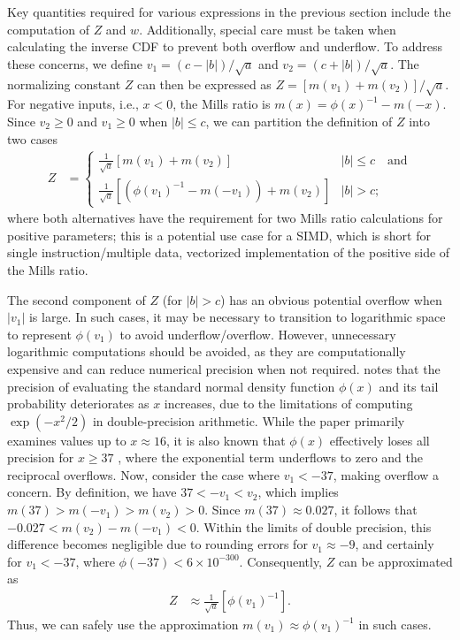 Key quantities required for various expressions in the previous section include the computation of $Z$ and $w$. Additionally, special care must be taken when calculating the inverse CDF to prevent both overflow and underflow. To address these concerns, we define $
v_{1}=\left(c-\left|b\right|\right)/\sqrt{a}$ and $ 
v_{2}=\left(c+\left|b\right|\right)/\sqrt{a}$. The normalizing constant 
$Z$ can then be expressed as
$Z = \left[m\left(v_{1}\right)+m\left(v_{2}\right)\right]/\sqrt{a}$.
For negative inputs, i.e., $x<0$, the Mills ratio is 
$m\left(x\right)=\phi\left(x\right)^{-1}-m\left(-x\right)$. Since $v_{2}\ge 0$ and $v_{1}\ge 0$ when $\left|b\right|\le c$, we can partition the definition of $Z$ into two cases
\begin{align*}
Z & =\begin{cases}
\frac{1}{\sqrt{a}}\left[m\left(v_{1}\right)+m\left(v_{2}\right)\right] & \left|b\right|\le c \quad \mbox{and}\\
\frac{1}{\sqrt{a}}\left[\left(\phi\left(v_{1}\right)^{-1}-m\left(-v_{1}\right)\right)+m\left(v_{2}\right)\right] & \left|b\right|>c;
\end{cases}
\end{align*}
where both alternatives have the requirement for two Mills ratio
calculations for positive parameters; this is a potential use case
for a SIMD, which is short for single instruction/multiple data, vectorized implementation of the positive side of the Mills ratio. 

The second component of $Z$ (for $\left|b\right|>c$) has an obvious
potential overflow when $\left|v_{1}\right|$ is large.  In such cases, it may be necessary to transition to logarithmic space to represent $\phi\left(v_{1}\right)$
to avoid underflow/overflow.
However, unnecessary logarithmic computations should be avoided, as they are computationally expensive and can reduce numerical precision when not required. \citet{marsaglia2004evaluating} notes that the precision of evaluating the standard normal density function $\phi\left(x\right)$ and its tail probability deteriorates as 
$x$ increases, due to the limitations of computing $\exp(-x^2/2)$ in double-precision arithmetic. While the paper primarily examines values up to $x \approx 16$, it is also known that $\phi\left(x\right)$ effectively loses all precision for $x\geq 37$ , where the exponential term underflows to zero and the reciprocal overflows. Now, consider the case where $v_{1}<-37$, making overflow a concern. 
By definition, we have $37<-v_{1}<v_{2}$, which implies $m\left(37\right)>m\left(-v_{1}\right)>m\left(v_{2}\right)>0$. Since $m\left(37\right)\approx0.027$, it follows that  $-0.027<m\left(v_{2}\right)-m\left(-v_{1}\right)<0$. Within the limits of double precision, this difference becomes negligible due to rounding errors for $v_{1}\approx-9$, and certainly for $v_{1}<-37$, where $\phi\left(-37\right)<6\times10^{-300}$. Consequently, $Z$ can be approximated as
\begin{align*}
Z & \approx\frac{1}{\sqrt{a}}\left[\phi\left(v_{1}\right)^{-1}\right].
\end{align*}
 Thus, we can safely use the approximation $m\left(v_{1}\right)\approx\phi\left(v_{1}\right)^{-1}$ in such cases.




